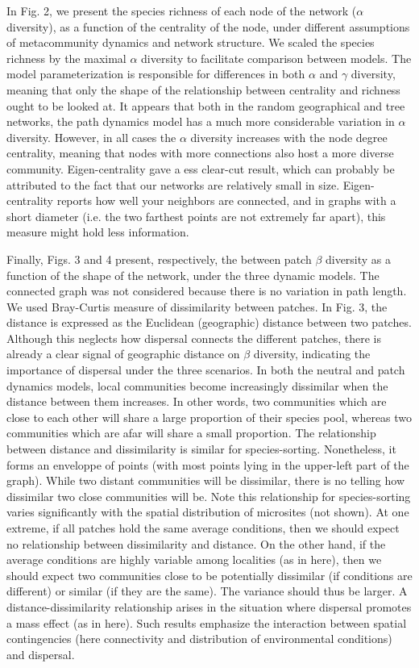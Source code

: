 \documentclass[12pt]{article}
\begin{document}
In Fig. 2, we present the species richness of each node of the network ($\alpha$
diversity), as a function of the centrality of the node, under different
assumptions of metacommunity dynamics and network structure. We scaled the
species richness by the maximal $\alpha$ diversity to facilitate comparison
between models. The model parameterization is responsible for differences in
both $\alpha$ and $\gamma$ diversity, meaning that only the shape of the
relationship between centrality and richness ought to be looked at. It appears
that both in the random geographical and tree networks, the path dynamics model has a
much more considerable variation in $\alpha$ diversity. However, in all
cases the $\alpha$ diversity increases with the node degree centrality, meaning
that nodes with more connections also host a more diverse community.
Eigen-centrality gave a ess clear-cut result, which can probably be
attributed to the fact that our networks are relatively small in size.
Eigen-centrality reports how well your neighbors are connected, and in graphs
with a short diameter (i.e. the two farthest points are not extremely far
apart), this measure might hold less information.

Finally, Figs. 3 and 4 present, respectively, the between patch $\beta$
diversity as a function of the shape of the network, under the three dynamic
models. The connected graph was not considered because there is no variation in
path length. We used Bray-Curtis measure of dissimilarity between patches. In
Fig. 3, the distance is expressed as the Euclidean (geographic) distance between
two patches. Although this neglects how dispersal connects the different
patches, there is already a clear signal of geographic distance on $\beta$
diversity, indicating the importance of dispersal under the three scenarios. In
both the neutral and patch dynamics models, local communities become increasingly
dissimilar when the distance between them increases. In other words, two
communities which are close to each other will share a large proportion of their
species pool, whereas two communities which are afar will share a small
proportion. The relationship between distance and dissimilarity is similar for
species-sorting. Nonetheless, it forms an enveloppe of points (with most points
lying in the upper-left part of the graph). While two distant communities will
be dissimilar, there is no telling how dissimilar two close communities will be.
Note this relationship for species-sorting varies significantly with the spatial
distribution of microsites (not shown). At one extreme, if all patches hold the
same average conditions, then we should expect no relationship between
dissimilarity and distance. On the other hand, if the average conditions are
highly variable among localities (as in here), then we should expect two
communities close to be potentially dissimilar (if conditions are different) or
similar (if they are the same). The variance should thus be larger. A
distance-dissimilarity relationship arises in the situation where dispersal
promotes a mass effect (as in here). Such results emphasize the interaction
between spatial contingencies (here connectivity and distribution of
environmental conditions) and dispersal.
\end{document}

